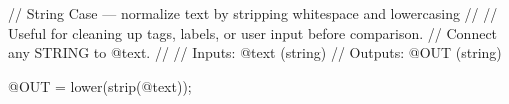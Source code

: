 // String Case — normalize text by stripping whitespace and lowercasing
//
// Useful for cleaning up tags, labels, or user input before comparison.
// Connect any STRING to @text.
//
// Inputs:  @text (string)
// Outputs: @OUT  (string)

@OUT = lower(strip(@text));
